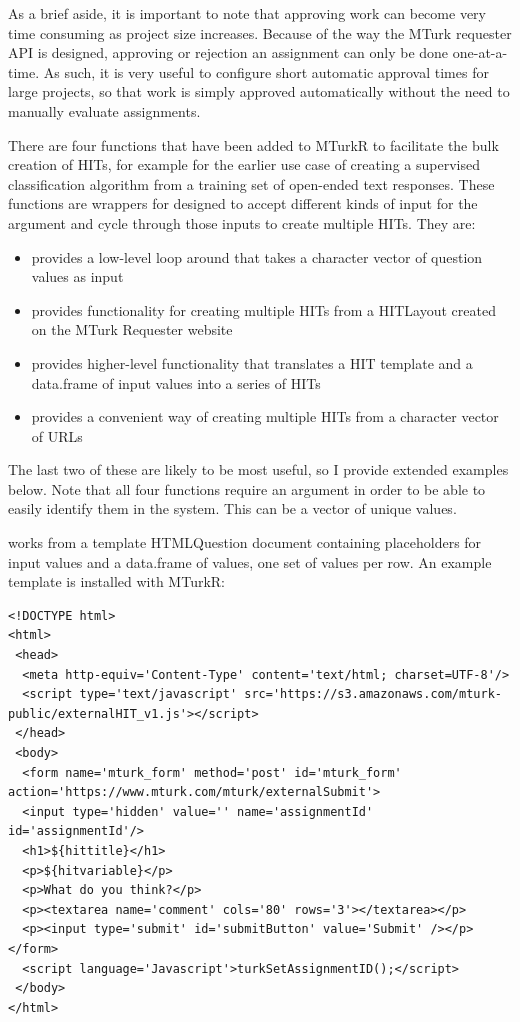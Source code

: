 As a brief aside, it is important to note that approving work can become very time consuming as project size increases. Because of the way the MTurk requester API is designed, approving or rejection an assignment can only be done one-at-a-time. As such, it is very useful to configure short automatic approval times for large projects, so that work is simply approved automatically without the need to manually evaluate assignments.

There are four functions that have been added to MTurkR to facilitate the bulk creation of HITs, for example for the earlier use case of creating a supervised classification algorithm from a training set of open-ended text responses. These functions are wrappers for  designed to accept different kinds of input for the  argument and cycle through those inputs to create multiple HITs. They are: 

\begin{itemize}
\item {} provides a low-level loop around  that takes a character vector of question values as input
\item {} provides functionality for creating multiple HITs from a HITLayout created on the MTurk Requester website
\item {} provides higher-level functionality that translates a HIT template and a data.frame of input values into a series of HITs
\item {} provides a convenient way of creating multiple HITs from a character vector of URLs
\end{itemize}

\noindent The last two of these are likely to be most useful, so I provide extended examples below. Note that all four functions require an  argument in order to be able to easily identify them in the system. This can be a vector of unique values.

 works from a template HTMLQuestion document containing placeholders for input values and a data.frame of values, one set of values per row. An example template is installed with MTurkR:

\begin{verbatim}
<!DOCTYPE html>
<html>
 <head>
  <meta http-equiv='Content-Type' content='text/html; charset=UTF-8'/>
  <script type='text/javascript' src='https://s3.amazonaws.com/mturk-public/externalHIT_v1.js'></script>
 </head>
 <body>
  <form name='mturk_form' method='post' id='mturk_form' action='https://www.mturk.com/mturk/externalSubmit'>
  <input type='hidden' value='' name='assignmentId' id='assignmentId'/>
  <h1>${hittitle}</h1>
  <p>${hitvariable}</p>
  <p>What do you think?</p>
  <p><textarea name='comment' cols='80' rows='3'></textarea></p>
  <p><input type='submit' id='submitButton' value='Submit' /></p></form>
  <script language='Javascript'>turkSetAssignmentID();</script>
 </body>
</html>
\end{verbatim}

